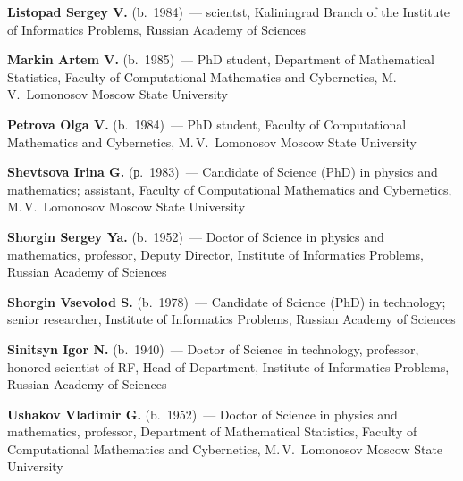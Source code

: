 \begin{multicols}{2}
\vspace*{6pt}

\noindent
\textbf{Listopad Sergey V.} (b.\ 1984)~--- scientst, Kaliningrad Branch of the Institute of 
Informatics Problems, Russian Academy of Sciences

\vspace*{6pt}

\noindent
\textbf{Markin Artem V.} (b.\ 1985)~--- PhD student, Department of Mathematical Statistics, 
Faculty of Computational Mathematics and Cybernetics, M.\,V.~Lomonosov Moscow State University

\vspace*{6pt}

\noindent %
\textbf{Petrova Olga V.} (b.\ 1984)~--- PhD student, Faculty of 
Computational Mathematics and Cybernetics, M.\,V.~Lomonosov Moscow State University


\vspace*{6pt}

\noindent
\textbf{Shevtsova Irina G.} (р.\ 1983)~--- Candidate of Science (PhD) in 
physics and mathematics; assistant, Faculty of 
Computational Mathematics and Cybernetics, M.\,V.~Lomonosov Moscow State University

\vspace*{6pt}

\noindent %
\textbf{Shorgin Sergey Ya.} (b.\ 1952)~--- Doctor of Science in physics and mathematics,
professor, Deputy Director, Institute of Informatics Problems, Russian Academy of
Sciences


\vspace*{6pt}

\noindent
\textbf{Shorgin Vsevolod S.} (b.\ 1978)~--- Candidate of Science (PhD) in 
technology; senior researcher, Institute of Informatics Problems, Russian Academy of Sciences

\vspace*{6pt}

\noindent 
\textbf{Sinitsyn Igor N.} (b.\ 1940)~--- Doctor of Science in technology,
professor, honored scientist  of RF,
Head of Department, Institute of Informatics Problems,  Russian Academy of Sciences

\vspace*{6pt}


\noindent %
\textbf{Ushakov Vladimir G.} (b.\ 1952)~--- Doctor of Science in physics and mathematics,
professor, Department of Mathematical Statistics, Faculty of Computational Mathematics and Cybernetics,
M.\,V.~Lomonosov Moscow State University


\end{multicols}
